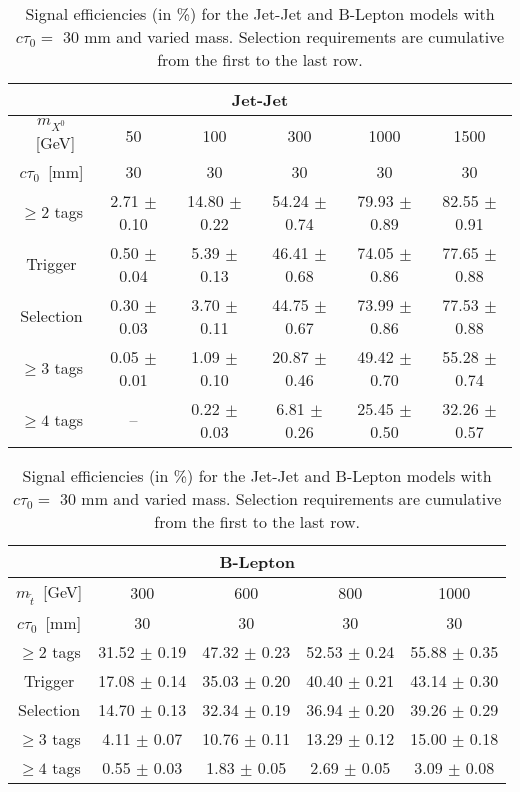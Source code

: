 \begin{table}[tb]
\begin{center}
  \caption{ Signal efficiencies (in \%) for the Jet-Jet and B-Lepton models
    with $c\tau_0=$ 30 mm and varied mass. Selection requirements are cumulative from
    the first to the last row. \label{tab:cutflow_30mm}}

\begin{tabular}{cccccc}
\multicolumn{6}{c}{\textbf{Jet-Jet}} \\
 \hline 
 $m_{X^0}$~[GeV] & 50 & 100 & 300 & 1000 & 1500 \\ 
 $c\tau_0$~[mm] & 30 & 30 & 30 & 30 & 30 \\ 
 \hline 
 $\geq 2$ tags & 2.71 $\pm$ 0.10 & 14.80 $\pm$ 0.22  & 54.24 $\pm$ 0.74 & 79.93 $\pm$ 0.89 & 82.55 $\pm$ 0.91 \\ 
 Trigger       & 0.50 $\pm$ 0.04 & 5.39 $\pm$ 0.13   & 46.41 $\pm$ 0.68 & 74.05 $\pm$ 0.86 & 77.65 $\pm$ 0.88 \\ 
 Selection     & 0.30 $\pm$ 0.03 & 3.70 $\pm$ 0.11   & 44.75 $\pm$ 0.67 & 73.99 $\pm$ 0.86 & 77.53 $\pm$ 0.88 \\ 
 $\geq 3$ tags & 0.05 $\pm$ 0.01 & 1.09 $\pm$ 0.10   & 20.87 $\pm$ 0.46 & 49.42 $\pm$ 0.70 & 55.28 $\pm$ 0.74 \\ 
 $\geq 4$ tags & --              & 0.22 $\pm$ 0.03   & 6.81 $\pm$ 0.26  & 25.45 $\pm$ 0.50 & 32.26 $\pm$ 0.57 \\ 
\end{tabular}

\begin{tabular}{ccccc}
\multicolumn{5}{c}{\textbf{B-Lepton}}\\
\hline
 $m_{\tilde{t}}$~[GeV] & 300 & 600 & 800 & 1000 \\
 $c\tau_0$~[mm] & 30 & 30 & 30 & 30 \\
 \hline
 $\geq 2$ tags & 31.52 $\pm$ 0.19  & 47.32 $\pm$ 0.23  & 52.53 $\pm$ 0.24  & 55.88 $\pm$ 0.35  \\ 
Trigger        & 17.08 $\pm$ 0.14  & 35.03 $\pm$ 0.20  & 40.40 $\pm$ 0.21  & 43.14 $\pm$ 0.30  \\ 
Selection      & 14.70 $\pm$ 0.13  & 32.34 $\pm$ 0.19  & 36.94 $\pm$ 0.20  & 39.26 $\pm$ 0.29  \\ 
$\geq 3$ tags  & 4.11 $\pm$ 0.07 & 10.76 $\pm$ 0.11  & 13.29 $\pm$ 0.12  & 15.00 $\pm$ 0.18  \\ 
$\geq 4$ tags  & 0.55 $\pm$ 0.03 & 1.83 $\pm$ 0.05   & 2.69 $\pm$ 0.05 & 3.09 $\pm$ 0.08 \\ 
\end{tabular}
\end{center}
\end{table}

